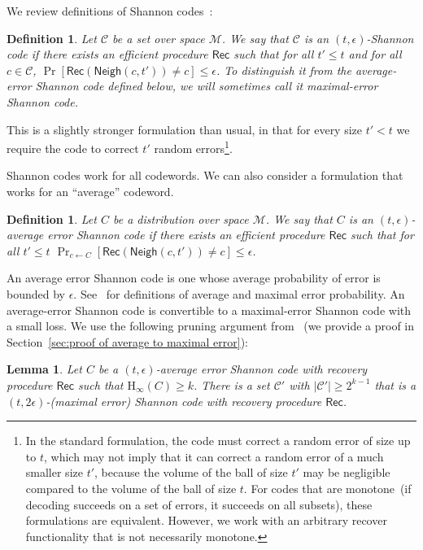 \documentclass[11pt]{article}
\newcommand{\secref}[1]{\mbox{Section~\ref{#1}}}
\newcommand{\class}[1]{{\ensuremath{\mathsf{#1}}}}
\newcommand{\rec}{\ensuremath{\class{Rec}}\xspace}
\newcommand{\neigh}{\ensuremath{\class{Neigh}}\xspace}
\newcommand{\Hoo}{\mathrm{H}_\infty}
\newtheorem{lemma}[theorem]{Lemma}
\newtheorem{definition}[theorem]{Definition}
\begin{document}
We review definitions of Shannon codes~\cite{shannon1949mathematical}:
\begin{definition}
\label{def:shannon-code}
Let $\mathcal{C}$ be a set over space $\mathcal{M}$.  We say that $\mathcal{C}$ is an $(t,\epsilon)$-\emph{Shannon code} if there exists an efficient procedure $\rec$ such that for all $t'\le t$ and for all $c\in \mathcal{C}$, $\Pr[\rec(\neigh(c, t')) \neq c]\le \epsilon$. To distinguish it from the average-error Shannon code defined below, we will sometimes call it \emph{maximal-error} Shannon code.
\end{definition}
This is a slightly stronger formulation than usual, in that for every size  $t'<t$ we require the code to correct $t'$ random errors\footnote{In the standard formulation, the code must correct a random error of size up to $t$, which may not imply that it can correct a random error of a much smaller size $t'$, because the volume of the ball of size $t'$ may be negligible compared to the volume of the ball of size $t$.  For codes that are monotone~(if decoding succeeds on a set of errors, it succeeds on all subsets), these formulations are equivalent.  However, we work with an arbitrary recover functionality that is not necessarily monotone.}.  

Shannon codes work for all codewords. We can also consider a formulation that works for an ``average'' codeword. 

 \begin{definition}
Let $C$ be a distribution over space $\mathcal{M}$.  We say that $C$ is an $(t,\epsilon)$-\emph{average error Shannon code} if there exists an efficient procedure $\rec$ such that for all $t'\le t$
$\Pr_{c\leftarrow C}[\rec(\neigh(c, t')) \neq c]\le \epsilon$.
\end{definition}
An average error Shannon code is one whose average probability of error is bounded by $\epsilon$.  See~\cite[Pages 192-194]{cover2006elements} for definitions of average and maximal error probability.  An average-error Shannon code is convertible to a maximal-error Shannon code with a small loss.  We use the following pruning argument from~\cite[Pages 202-204]{cover2006elements} (we provide a proof in \secref{sec:proof of average to maximal error}):
\begin{lemma}
\label{lem:averageToMaximalError}
Let $C$ be a $(t, \epsilon)$-average error Shannon code with recovery procedure $\rec$ such that $\Hoo(C)\geq k$.  There is a set $\mathcal{C}'$ with $|\mathcal{C}'|\ge2^{k-1}$ that  is a $(t, 2\epsilon)$-(maximal error) Shannon code with recovery procedure $\rec$.
\end{lemma}
\end{document}
